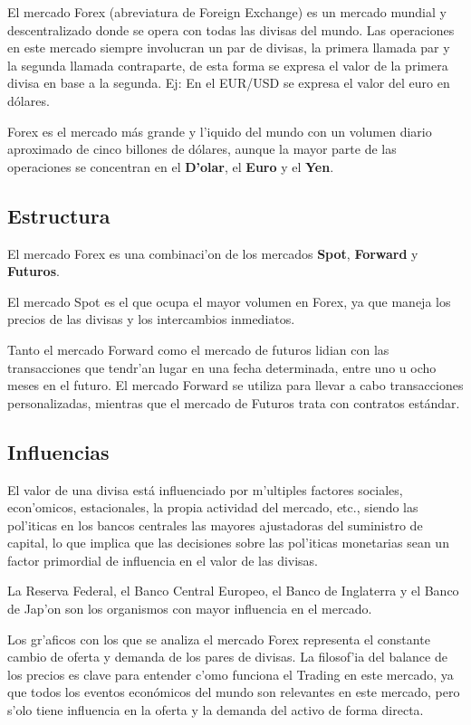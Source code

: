 El mercado Forex (abreviatura de Foreign Exchange) es un mercado mundial y descentralizado donde se opera con todas las divisas del mundo.
Las operaciones en este mercado siempre involucran un par de divisas, la primera llamada par y la segunda llamada contraparte, de esta forma se expresa el valor de la primera divisa en base a la segunda. Ej: En el EUR/USD se expresa el valor del euro en dólares. 
 
Forex es el mercado más grande y l'iquido del mundo con un volumen diario aproximado de cinco billones de dólares, aunque la mayor parte de las operaciones se concentran en el \textbf{D'olar}, el \textbf{Euro} y el \textbf{Yen}.

\subsection{Estructura}
El mercado Forex es una combinaci'on de los mercados \textbf{Spot}, \textbf{Forward} y \textbf{Futuros}.

El mercado Spot es el que ocupa el mayor volumen en Forex, ya que maneja los precios de las divisas y los intercambios inmediatos. 

Tanto el mercado Forward como el mercado de futuros lidian con las transacciones que tendr'an lugar en una fecha determinada, entre uno u ocho meses en el futuro. El mercado Forward se utiliza para llevar a cabo transacciones personalizadas, mientras que el mercado de Futuros trata con contratos estándar.



\subsection{Influencias}
El valor de una divisa está influenciado por m'ultiples factores sociales, econ'omicos, estacionales, la propia actividad del mercado, etc., siendo las pol'iticas en los bancos centrales las mayores ajustadoras del suministro de capital, lo que implica que las decisiones sobre las pol'iticas monetarias sean un factor primordial de influencia en el valor de las divisas.

La Reserva Federal, el Banco Central Europeo, el Banco de Inglaterra y el Banco de Jap'on son los organismos con mayor influencia en el mercado.

Los gr'aficos con los que se analiza el mercado Forex representa el constante cambio de oferta y demanda de los pares de divisas. La filosof'ia del balance de los precios es clave para entender c'omo funciona el Trading en este mercado, ya que todos los eventos económicos del mundo son relevantes en este mercado, pero s'olo tiene influencia en la oferta y la demanda del activo de forma directa. \cite{forex1}


